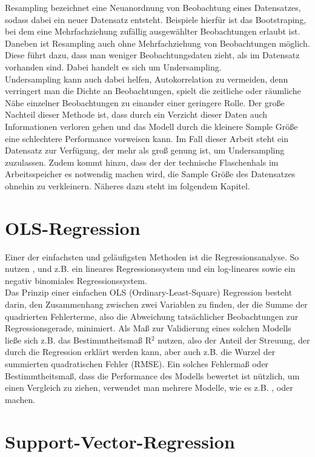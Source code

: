 \documentclass[a4paper,12pt]{thesis}
\begin{document}
Resampling bezeichnet eine Neuanordnung von Beobachtung eines Datensatzes, sodass dabei ein neuer Datensatz entsteht. Beispiele hierfür ist das Bootstraping, bei dem eine Mehrfachziehung zufällig ausgewählter Beobachtungen erlaubt ist. Daneben ist Resampling auch ohne Mehrfachziehung von Beobachtungen möglich. Diese führt dazu, dass man weniger Beobachtungsdaten zieht, als im Datensatz vorhanden sind. Dabei handelt es sich um Undersampling.\\
Undersampling kann auch dabei helfen, Autokorrelation zu vermeiden, denn verringert man die Dichte an Beobachtungen, spielt die zeitliche oder räumliche Nähe einzelner Beobachtungen zu einander einer geringere Rolle. Der große Nachteil dieser Methode ist, dass durch ein Verzicht dieser Daten auch Informationen verloren gehen und das Modell durch die kleinere Sample Größe eine schlechtere Performance vorweisen kann. Im Fall dieser Arbeit steht ein Datensatz zur Verfügung, der mehr als groß genung ist, um Undersampling zuzulassen. Zudem kommt hinzu, dass der der technische Flaschenhals im Arbeitsspeicher es notwendig machen wird, die Sample Größe des Datensatzes ohnehin zu verkleinern. Näheres dazu steht im folgendem Kapitel.

\section{OLS-Regression}

Einer der einfachsten und geläufigsten Methoden ist die Regressionsanalyse. So nutzen \cite{Holmgren2017}, \cite{Alattar2021} und \cite{Gao2022} z.B. ein lineares Regressionssystem und \cite{Wessel2020} ein log-lineares sowie ein negativ binomiales Regressionssystem.\\
Das Prinzip einer einfachen OLS (Ordinary-Least-Square) Regression besteht darin, den Zusammenhang zwischen zwei Variablen zu finden, der die Summe der quadrierten Fehlerterme, also die Abweichung tatsächlicher Beobachtungen zur Regressionsgerade, minimiert. Als Maß zur Validierung eines solchen Modells ließe sich z.B. das Bestimmtheitsmaß R$^2$ nutzen, also der Anteil der Streuung, der durch die Regression erklärt werden kann, aber auch z.B. die Wurzel der summierten quadratischen Fehler (RMSE). Ein solches Fehlermaß oder Bestimmtheitsmaß, dass die Performance des Modells bewertet ist nützlich, um einen Vergleich zu ziehen, verwendet man mehrere Modelle, wie es z.B. \cite{Holmgren2017}, \cite{Broucke2019} oder \cite{Gao2022} machen.

\section{Support-Vector-Regression}
\end{document}
